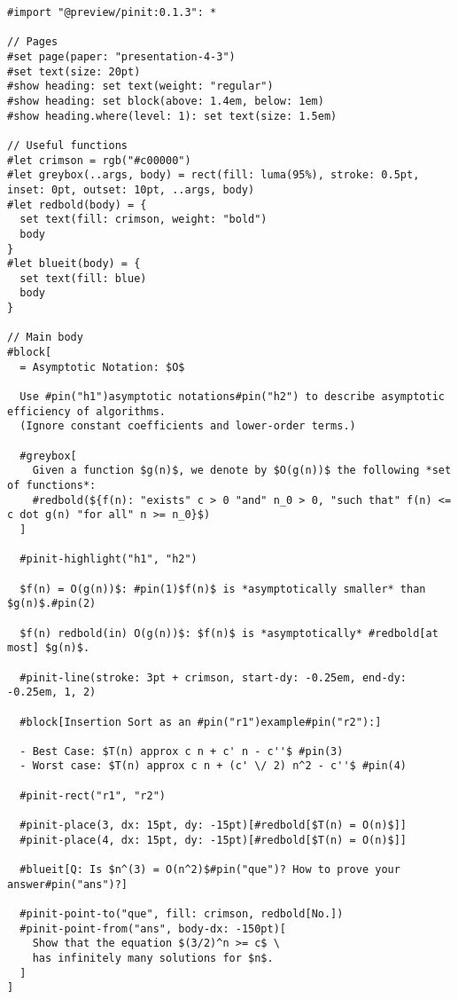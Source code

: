 \begin{verbatim}
#import "@preview/pinit:0.1.3": *

// Pages
#set page(paper: "presentation-4-3")
#set text(size: 20pt)
#show heading: set text(weight: "regular")
#show heading: set block(above: 1.4em, below: 1em)
#show heading.where(level: 1): set text(size: 1.5em)

// Useful functions
#let crimson = rgb("#c00000")
#let greybox(..args, body) = rect(fill: luma(95%), stroke: 0.5pt, inset: 0pt, outset: 10pt, ..args, body)
#let redbold(body) = {
  set text(fill: crimson, weight: "bold")
  body
}
#let blueit(body) = {
  set text(fill: blue)
  body
}

// Main body
#block[
  = Asymptotic Notation: $O$

  Use #pin("h1")asymptotic notations#pin("h2") to describe asymptotic efficiency of algorithms.
  (Ignore constant coefficients and lower-order terms.)

  #greybox[
    Given a function $g(n)$, we denote by $O(g(n))$ the following *set of functions*:
    #redbold(${f(n): "exists" c > 0 "and" n_0 > 0, "such that" f(n) <= c dot g(n) "for all" n >= n_0}$)
  ]

  #pinit-highlight("h1", "h2")

  $f(n) = O(g(n))$: #pin(1)$f(n)$ is *asymptotically smaller* than $g(n)$.#pin(2)

  $f(n) redbold(in) O(g(n))$: $f(n)$ is *asymptotically* #redbold[at most] $g(n)$.

  #pinit-line(stroke: 3pt + crimson, start-dy: -0.25em, end-dy: -0.25em, 1, 2)

  #block[Insertion Sort as an #pin("r1")example#pin("r2"):]

  - Best Case: $T(n) approx c n + c' n - c''$ #pin(3)
  - Worst case: $T(n) approx c n + (c' \/ 2) n^2 - c''$ #pin(4)

  #pinit-rect("r1", "r2")

  #pinit-place(3, dx: 15pt, dy: -15pt)[#redbold[$T(n) = O(n)$]]
  #pinit-place(4, dx: 15pt, dy: -15pt)[#redbold[$T(n) = O(n)$]]

  #blueit[Q: Is $n^(3) = O(n^2)$#pin("que")? How to prove your answer#pin("ans")?]

  #pinit-point-to("que", fill: crimson, redbold[No.])
  #pinit-point-from("ans", body-dx: -150pt)[
    Show that the equation $(3/2)^n >= c$ \
    has infinitely many solutions for $n$.
  ]
]
\end{verbatim}

\pandocbounded{}


